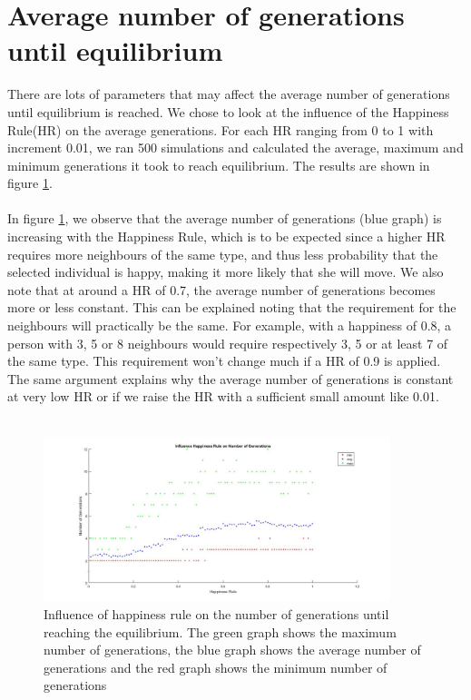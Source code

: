 
\section{Average number of generations until equilibrium}
There are lots of parameters that may affect the average number of generations until  equilibrium is reached. We chose to look at the influence of the Happiness Rule(HR) on the average generations. For each HR ranging from 0 to 1 with increment 0.01, we ran 500 simulations and calculated the average, maximum and minimum generations it took to reach equilibrium. The results are shown in figure \ref{fig:avegen}.\\
\\
In figure \ref{fig:avegen}, we observe that the average number of generations (blue graph) is increasing with the Happiness Rule, which is to be expected since a higher HR requires more neighbours of the same type, and thus less probability that the selected individual is happy, making it more likely that she will move. We also note that at around a HR of 0.7, the average number of generations becomes more or less constant. This can be explained noting that the requirement for the neighbours will practically be the same. For example, with a happiness of 0.8, a person with 3, 5 or 8 neighbours would require respectively 3, 5 or at least 7 of the same type. This requirement won't change much if a HR of 0.9 is applied. The same argument explains why the average number of generations is constant at very low HR or if we raise the HR with a sufficient small amount like 0.01.\\
\\
\begin{figure}[h!]
    \centering
    \includegraphics[width=0.9\textwidth]{happinessregel_aantgen_2}
    \caption{Influence of happiness rule on the number of generations until reaching the equilibrium. The green graph shows the maximum number of generations, the blue graph shows the average number of generations and the red graph shows the minimum number of generations}
    \label{fig:avegen}
\end{figure}
